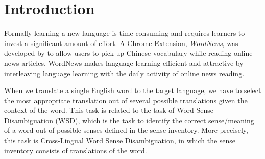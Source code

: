 \documentclass[11pt]{article}
\begin{document}
\section{Introduction}
\label{intro}

%
% 
\iffalse
\blfootnote{
    \hspace{-0.65cm}  %
    Place licence statement here for the camera-ready version, see
    Section~\ref{licence} of the instructions for preparing a
    manuscript.
}
\fi

Formally learning a new language is time-consuming and requires learners to invest a significant
amount of effort. A Chrome Extension, {\it WordNews}, was developed by \cite{tao2014} to allow users to pick up Chinese vocabulary while reading online news articles. WordNews makes language learning efficient and attractive by interleaving language
learning with the daily activity of online news reading. 

	
When we translate a single English word to the target language, we have to select the most appropriate translation out of several possible translations given the context of the word. This task is related to the task of Word Sense Disambiguation (WSD), which is the task to identify the correct sense/meaning of a word out of possible senses defined in the sense inventory. More precisely, this task is Cross-Lingual Word Sense Disambiguation, in which the sense inventory consists of translations of the word.
\end{document}
